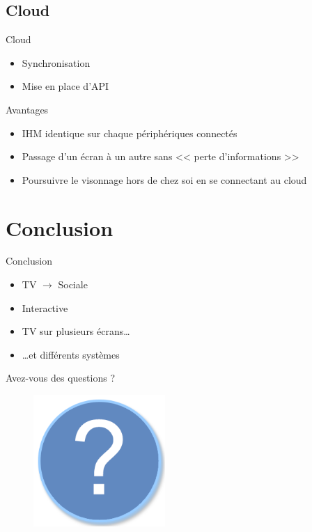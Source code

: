\documentclass{beamer}
\begin{document}
	\subsection{Cloud}
	\begin{frame}{Cloud}
		\begin{itemize}
			\item Synchronisation
		\pause
			\item Mise en place d'API
		\end{itemize}
		\begin{exampleblock}{Avantages}
			\begin{itemize}
				\item IHM identique sur chaque périphériques connectés
				\item Passage d'un écran à un autre sans << perte d'informations >>
				\item Poursuivre le visonnage hors de chez soi en se connectant au cloud
			\end{itemize}
		\end{exampleblock}
	\end{frame}

	\section*{Conclusion}
	\begin{frame}{Conclusion}
		\begin{itemize}
			\item TV $\rightarrow$ Sociale
				\pause
			\item Interactive
				\pause
			\item TV sur plusieurs écrans\ldots
				\pause
			\item \ldots et différents systèmes
		\end{itemize}
	\end{frame}

	\begin{frame}{Avez-vous des questions ?}
		\begin{figure}[H]
			\centering
			\includegraphics[width=5cm]{questions.png}
		\end{figure}
	\end{frame}
\end{document}
